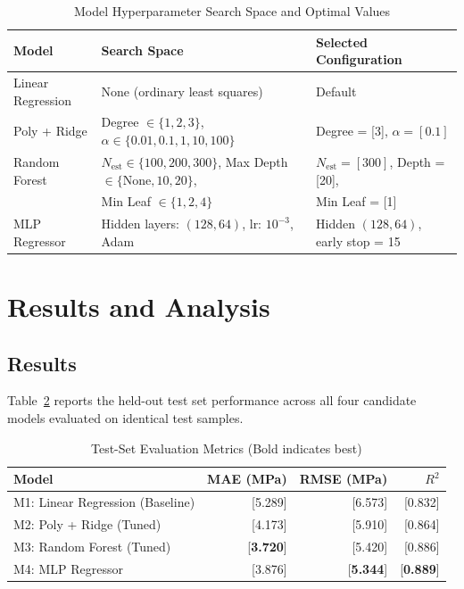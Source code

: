 \documentclass[conference]{IEEEtran}
\begin{document}
\begin{table}[htbp]
\caption{Model Hyperparameter Search Space and Optimal Values}
\label{tab:hyperparams}
\centering
\small
\begin{tabular}{lll}
\toprule
\textbf{Model} & \textbf{Search Space} & \textbf{Selected Configuration} \\
\midrule
Linear Regression & None (ordinary least squares) & Default \\
Poly + Ridge & Degree $\in \{1, 2, 3\}$, $\alpha \in \{0.01, 0.1, 1, 10, 100\}$ & Degree = [3], $\alpha = [0.1]$ \\
Random Forest & $N_{\text{est}} \in \{100, 200, 300\}$, Max Depth $\in \{\text{None}, 10, 20\}$, & $N_{\text{est}} = [300]$, Depth = [20], \\
              & Min Leaf $\in \{1, 2, 4\}$ & Min Leaf = [1] \\
MLP Regressor & Hidden layers: $(128, 64)$, lr: $10^{-3}$, Adam & Hidden $(128, 64)$, early stop = 15 \\
\bottomrule
\end{tabular}
\end{table}

\section{Results and Analysis}

\subsection{Results}
Table~\ref{tab:results} reports the held-out test set performance across all four candidate models evaluated on identical test samples.

\begin{table}[htbp]
\caption{Test-Set Evaluation Metrics (Bold indicates best)}
\label{tab:results}
\centering
\small
\begin{tabular}{lrrr}
\toprule
\textbf{Model} & \textbf{MAE (MPa)} & \textbf{RMSE (MPa)} & \textbf{$R^2$} \\
\midrule
M1: Linear Regression (Baseline) & [5.289] & [6.573] & [0.832] \\
M2: Poly + Ridge (Tuned)         & [4.173] & [5.910] & [0.864] \\
M3: Random Forest (Tuned)        & [\textbf{3.720}] & [5.420] & [0.886] \\
M4: MLP Regressor                & [3.876] & [\textbf{5.344}] & [\textbf{0.889}] \\
\bottomrule
\end{tabular}
\end{table}
\end{document}
